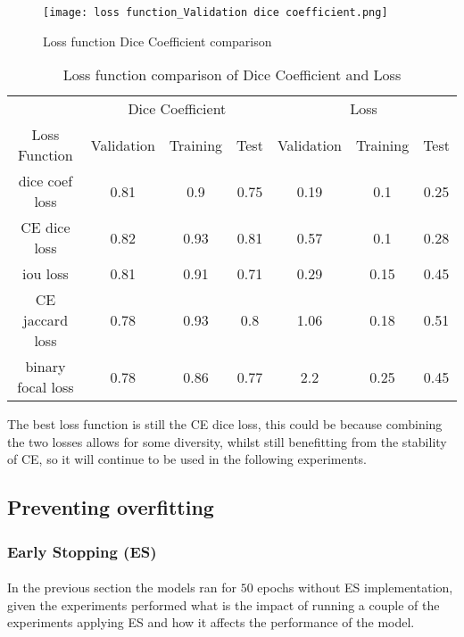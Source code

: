 \begin{figure}[hbt!]
    \centering
    \texttt{[image: loss function\_Validation dice coefficient.png]}
    \caption{Loss function Dice Coefficient comparison}
    \label{loss_dice}
\end{figure}

\begin{table}[ht!] 
    \begin{center}
    \begin{tabular}{ccccccc} 
    \toprule
       & \multicolumn{3}{c}{Dice Coefficient}     & \multicolumn{3}{c}{Loss} \\
    Loss Function & Validation & Training & Test & Validation & Training & Test \\ 
    \midrule
    dice coef loss & 0.81 & 0.9 & 0.75 & 0.19 & 0.1 & 0.25  \\ \rowcolor{lightgray} \gls{CE} dice loss & 0.82 & 0.93 & 0.81 & 0.57 & 0.1 & 0.28  \\ iou loss & 0.81 & 0.91 & 0.71 & 0.29 & 0.15 & 0.45  \\ \gls{CE} jaccard loss & 0.78 & 0.93 & 0.8 & 1.06 & 0.18 & 0.51  \\ binary focal loss & 0.78 & 0.86 & 0.77 & 2.2 & 0.25 & 0.45  \\
    \bottomrule
    \end{tabular}
  \end{center} 
  \caption{Loss function comparison of Dice Coefficient and Loss}\label{tab_loss}
\end{table}

The best loss function is still the \gls{CE} dice loss, this could be because combining the two losses allows for some diversity, whilst still benefitting from the stability of \gls{CE}, so it will continue to be used in the following experiments.

\subsection{Preventing overfitting} \label{regularisation_sec}
\subsubsection{Early Stopping (ES)}
\paragraph{}
In the previous section the models ran for $50$ epochs without \gls{ES} implementation, given the experiments performed what is the impact of running a couple of the experiments applying \gls{ES} and how it affects the performance of the model.

